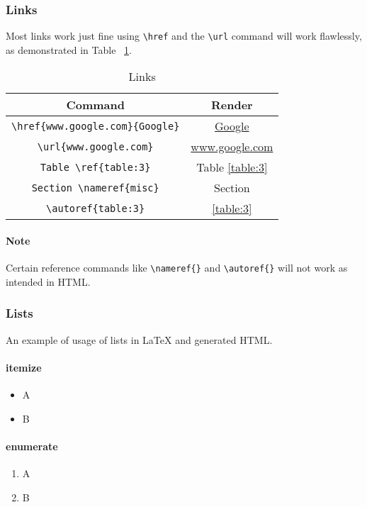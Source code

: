 \subsubsection{Links}
Most links work just fine using \verb|\href| and the \verb|\url| command will work flawlessly, as demonstrated in Table ~\ref{table:4}.

\begin{table}[htbp]
\centering
\begin{tabular}{| c | c |}
 \hline
 Command & Render \\
 \hline
 \verb|\href{www.google.com}{Google}| & \href{www.google.com}{Google} \\ \hline
\verb|\url{www.google.com}| & \url{www.google.com}  \\ \hline
\verb|Table \ref{table:3}| & Table \ref{table:3}  \\ \hline
\verb|Section \nameref{misc}| & Section \nameref{misc}\\ \hline
\verb|\autoref{table:3}| & \autoref{table:3} \\ \hline
\end{tabular}
\caption{Links}
\label{table:4}
\end{table}

\paragraph{Note}
Certain reference commands like \verb|\nameref{}| and \verb|\autoref{}| will not work as intended in HTML.

\subsubsection{Lists}

An example of usage of lists in LaTeX and  generated HTML.

\paragraph{itemize}
\begin{itemize}
\item A
\item B
\end{itemize}
\paragraph{enumerate}
\begin{enumerate}
\item A
\item B
\end{enumerate}
